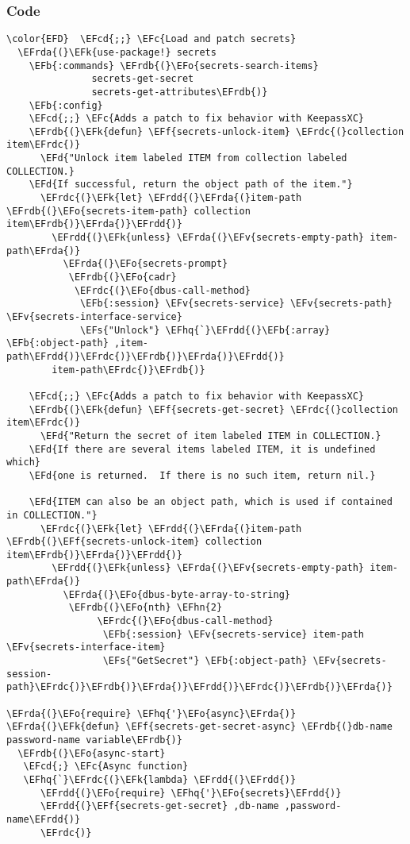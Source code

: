 \documentclass[a4wide,10pt]{article}
\newcommand{\EFc}[1]{\textcolor{EFc}{#1}} %
\newcommand{\EFcd}[1]{\textcolor{EFcd}{#1}} %
\newcommand{\EFs}[1]{\textcolor{EFs}{#1}} %
\newcommand{\EFd}[1]{\textcolor{EFd}{#1}} %
\newcommand{\EFk}[1]{\textcolor{EFk}{#1}} %
\newcommand{\EFb}[1]{\textcolor{EFb}{#1}} %
\newcommand{\EFf}[1]{\textcolor{EFf}{#1}} %
\newcommand{\EFv}[1]{\textcolor{EFv}{#1}} %
\newcommand{\EFo}[1]{\textcolor{EFo}{#1}} %
\newcommand{\EFhn}[1]{\textcolor{EFhn}{\textbf{#1}}} %
\newcommand{\EFhq}[1]{\textcolor{EFhq}{#1}} %
\newcommand{\EFrda}[1]{\textcolor{EFrda}{#1}} %
\newcommand{\EFrdb}[1]{\textcolor{EFrdb}{#1}} %
\newcommand{\EFrdc}[1]{\textcolor{EFrdc}{#1}} %
\newcommand{\EFrdd}[1]{\textcolor{EFrdd}{#1}} %
\begin{document}
\subsubsection{Code}
\label{sec:org56039fd}
\begin{Code}
\begin{Verbatim}
\color{EFD}  \EFcd{;;} \EFc{Load and patch secrets}
  \EFrda{(}\EFk{use-package!} secrets
    \EFb{:commands} \EFrdb{(}\EFo{secrets-search-items}
               secrets-get-secret
               secrets-get-attributes\EFrdb{)}
    \EFb{:config}
    \EFcd{;;} \EFc{Adds a patch to fix behavior with KeepassXC}
    \EFrdb{(}\EFk{defun} \EFf{secrets-unlock-item} \EFrdc{(}collection item\EFrdc{)}
      \EFd{"Unlock item labeled ITEM from collection labeled COLLECTION.}
    \EFd{If successful, return the object path of the item."}
      \EFrdc{(}\EFk{let} \EFrdd{(}\EFrda{(}item-path \EFrdb{(}\EFo{secrets-item-path} collection item\EFrdb{)}\EFrda{)}\EFrdd{)}
        \EFrdd{(}\EFk{unless} \EFrda{(}\EFv{secrets-empty-path} item-path\EFrda{)}
          \EFrda{(}\EFo{secrets-prompt}
           \EFrdb{(}\EFo{cadr}
            \EFrdc{(}\EFo{dbus-call-method}
             \EFb{:session} \EFv{secrets-service} \EFv{secrets-path} \EFv{secrets-interface-service}
             \EFs{"Unlock"} \EFhq{`}\EFrdd{(}\EFb{:array} \EFb{:object-path} ,item-path\EFrdd{)}\EFrdc{)}\EFrdb{)}\EFrda{)}\EFrdd{)}
        item-path\EFrdc{)}\EFrdb{)}

    \EFcd{;;} \EFc{Adds a patch to fix behavior with KeepassXC}
    \EFrdb{(}\EFk{defun} \EFf{secrets-get-secret} \EFrdc{(}collection item\EFrdc{)}
      \EFd{"Return the secret of item labeled ITEM in COLLECTION.}
    \EFd{If there are several items labeled ITEM, it is undefined which}
    \EFd{one is returned.  If there is no such item, return nil.}

    \EFd{ITEM can also be an object path, which is used if contained in COLLECTION."}
      \EFrdc{(}\EFk{let} \EFrdd{(}\EFrda{(}item-path \EFrdb{(}\EFf{secrets-unlock-item} collection item\EFrdb{)}\EFrda{)}\EFrdd{)}
        \EFrdd{(}\EFk{unless} \EFrda{(}\EFv{secrets-empty-path} item-path\EFrda{)}
          \EFrda{(}\EFo{dbus-byte-array-to-string}
           \EFrdb{(}\EFo{nth} \EFhn{2}
                \EFrdc{(}\EFo{dbus-call-method}
                 \EFb{:session} \EFv{secrets-service} item-path \EFv{secrets-interface-item}
                 \EFs{"GetSecret"} \EFb{:object-path} \EFv{secrets-session-path}\EFrdc{)}\EFrdb{)}\EFrda{)}\EFrdd{)}\EFrdc{)}\EFrdb{)}\EFrda{)}

\EFrda{(}\EFo{require} \EFhq{'}\EFo{async}\EFrda{)}
\EFrda{(}\EFk{defun} \EFf{secrets-get-secret-async} \EFrdb{(}db-name password-name variable\EFrdb{)}
  \EFrdb{(}\EFo{async-start}
   \EFcd{;} \EFc{Async function}
   \EFhq{`}\EFrdc{(}\EFk{lambda} \EFrdd{(}\EFrdd{)}
      \EFrdd{(}\EFo{require} \EFhq{'}\EFo{secrets}\EFrdd{)}
      \EFrdd{(}\EFf{secrets-get-secret} ,db-name ,password-name\EFrdd{)}
      \EFrdc{)}


\end{Verbatim}
\end{Code}
\end{document}
